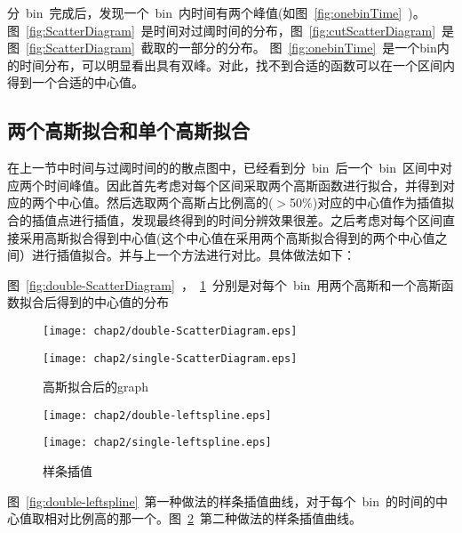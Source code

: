 分~bin~完成后，发现一个~bin~内时间有两个峰值(如图~\ref{fig:onebinTime}~)。图~\ref{fig:ScatterDiagram}~是时间对过阈时间的分布，图~\ref{fig:cutScatterDiagram}~是图~\ref{fig:ScatterDiagram}~截取的一部分的分布。
图~\ref{fig:onebinTime}~是一个bin内的时间分布，可以明显看出具有双峰。对此，找不到合适的函数可以在一个区间内得到一个合适的中心值。

\subsection{两个高斯拟合和单个高斯拟合}

在上一节中时间与过阈时间的的散点图中，已经看到分~bin~后一个~bin~区间中对应两个时间峰值。因此首先考虑对每个区间采取两个高斯函数进行拟合，并得到对应的两个中心值。然后选取两个高斯占比例高的($>$50$\%$)对应的中心值作为插值拟合的插值点进行插值，发现最终得到的时间分辨效果很差。之后考虑对每个区间直接采用高斯拟合得到中心值(这个中心值在采用两个高斯拟合得到的两个中心值之间）进行插值拟合。并与上一个方法进行对比。具体做法如下：

图~\ref{fig:double-ScatterDiagram}~，~\ref{fig:single-ScatterDiagram}~分别是对每个~bin~用两个高斯和一个高斯函数拟合后得到的中心值的分布

\begin{figure}[!h]
\begin{minipage}[!h]{0.5\linewidth}
\texttt{[image: chap2/double-ScatterDiagram.eps]}
\label{fig:double-ScatterDiagram}
\end{minipage}%
\hfill
\begin{minipage}[!h]{0.5\linewidth}
\texttt{[image: chap2/single-ScatterDiagram.eps]}
\label{fig:single-ScatterDiagram}
\end{minipage}
\caption{高斯拟合后的graph}
\end{figure}



\begin{figure}[!h]
\begin{minipage}[!h]{0.5\linewidth}
\texttt{[image: chap2/double-leftspline.eps]}
\label{fig:double-leftspline}
\end{minipage}%
\hfill
\begin{minipage}[!h]{0.5\linewidth}
\texttt{[image: chap2/single-leftspline.eps]}
\label{fig:single-leftspline}
\end{minipage}
\caption{样条插值}
\end{figure}
图~\ref{fig:double-leftspline}~第一种做法的样条插值曲线，对于每个~bin~的时间的中心值取相对比例高的那一个。图~\ref{fig:single-leftspline}~第二种做法的样条插值曲线。

